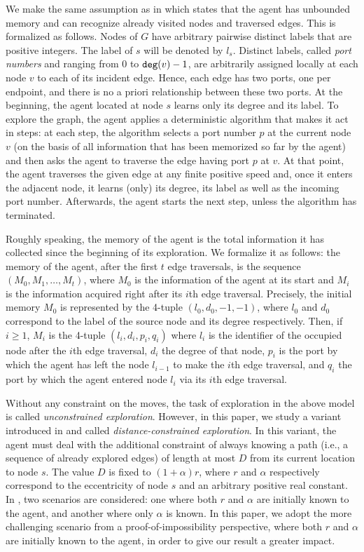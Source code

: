 \documentclass[11pt]{article}
\begin{document}
We make the same assumption as in \cite{DuncanKK06} which
states that the agent has unbounded memory and can recognize already
visited nodes and traversed edges.
This is formalized as follows. Nodes of $G$ have arbitrary pairwise
distinct labels that are positive integers. The label of $s$ will be denoted by $l_s$. Distinct labels, called
{\em port numbers} and ranging from $0$ to ${\tt deg}(v)-1$, are
arbitrarily assigned locally at each node $v$ to each of its incident
edge. Hence, each edge has two ports, one per endpoint, and there
is no a priori relationship between these two ports. At the beginning, the
agent located at node $s$
learns only its degree and its label. To explore the graph, the
agent applies a deterministic algorithm that makes it act in steps: at each step,
the algorithm selects a port number $p$ at the current node $v$ (on
the basis of all information that has been memorized so far by the
agent) and then asks the agent to traverse the edge having port $p$ at
$v$. At that point, the agent traverses the given edge at any finite positive speed and, once it enters the adjacent node, it learns (only) its
degree, its label as well as the incoming port number. Afterwards, the agent starts
the next step, unless the algorithm has terminated.

Roughly speaking, the memory of the agent is the total information it has collected since the beginning
of its exploration. We formalize it as follows: the
memory of the agent, after the first $t$ edge traversals, is the
sequence $(M_0,M_1,\dots ,M_t)$, where $M_0$ is the information of the
agent at its start and $M_i$ is the information acquired right after
its $i$th edge traversal. Precisely, the initial memory $M_0$ is
represented by the 4-tuple $(l_0,d_0,-1,-1)$, where $l_0$ and $d_0$
correspond to the label of the source node and its degree
respectively.  Then, if $i\geq 1$, $M_i$ is the 4-tuple
$(l_{i},d_i,p_i,q_i)$ where $l_i$ is the identifier of the occupied
node after the $i$th edge traversal, $d_i$ the degree of that node,
$p_i$ is the port by which the agent has left the node $l_{i-1}$ to
make the $i$th edge traversal, and $q_i$ the port by which the agent
entered node $l_i$ via its $i$th edge traversal.



Without any constraint on the moves, the task of exploration in the above model is called \emph{unconstrained exploration}. However, in this paper, we study a variant introduced in \cite{DuncanKK06} and called \emph{distance-constrained exploration}. In this variant, the agent must deal with the additional constraint of always knowing a path (i.e., a sequence of already explored edges) of length at most $D$ from its current location to node $s$. The value $D$ is fixed to $(1+\alpha)r$, where $r$ and $\alpha$ respectively correspond to the eccentricity of node $s$ and an arbitrary positive real constant.  In \cite{DuncanKK06}, two scenarios are considered: one where both $r$ and $\alpha$ are initially known to the agent, and another where only $\alpha$ is known. In this paper, we adopt the more challenging scenario from a proof-of-impossibility perspective, where both $r$ and $\alpha$ are initially known to the agent, in order to give our result a greater impact.
\end{document}
